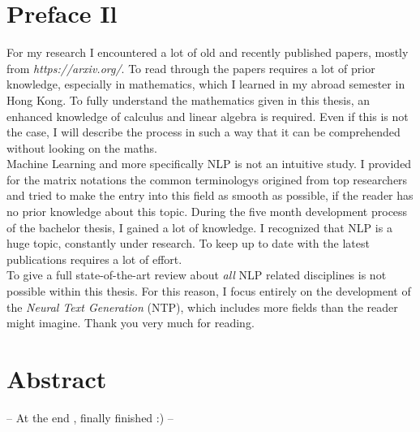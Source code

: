 \section*{Preface Il}
\label{sec:prolog_2}
For my research I encountered a lot of old and recently published papers, mostly from \textit{https://arxiv.org/}. 
To read through the papers requires a lot of prior knowledge, especially in mathematics, which I learned in my abroad semester in Hong Kong. 
To fully understand the mathematics given in this thesis, an enhanced knowledge of calculus and linear algebra is required. Even if this is not the case, I will describe the process in such a way that it can be comprehended without looking on the maths. \\
Machine Learning and more specifically NLP is not an intuitive study. I provided for the matrix notations the common terminologys origined from top researchers and tried to make the entry into this field as smooth as possible, if the reader has no prior knowledge about this topic.
During the five month development process of the bachelor thesis, I gained a lot of knowledge. I recognized that NLP is a huge topic, constantly under research. To keep up to date with the latest publications requires a lot of effort. \\
To give a full state-of-the-art review about \textit{all} NLP related disciplines is not possible within this thesis. For this reason, I focus entirely on the development of the \textit{Neural Text Generation} (NTP), which includes more fields than the reader might imagine.
Thank you very much for reading.




\section*{Abstract}
\label{sec:abstract}

-- At the end , finally finished :) --
